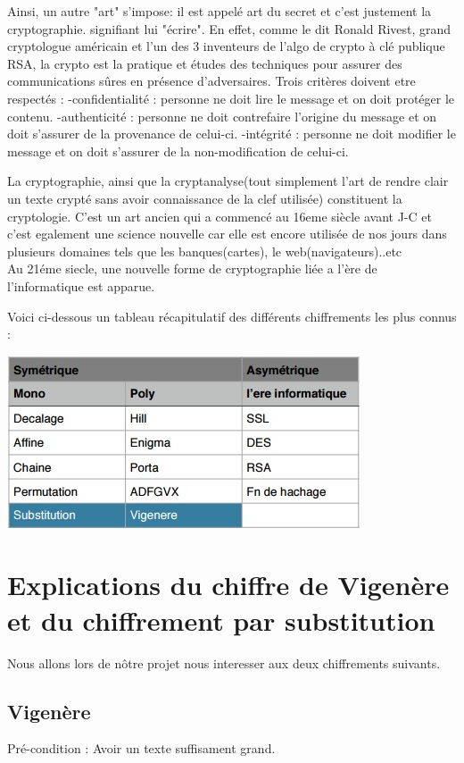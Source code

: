 \documentclass[a4]{article}
\begin{document}
				Ainsi, un autre "art" s'impose: il est appelé art du secret et c'est justement la cryptographie.
				signifiant lui "écrire". En effet, comme le dit Ronald Rivest, grand cryptologue américain et l'un des 3 inventeurs de l'algo
				de crypto à clé publique RSA, la crypto est la pratique et études des techniques pour assurer des communications sûres en présence d'adversaires.
				Trois critères doivent etre respectés : 
				-confidentialité : personne ne doit lire le message et on doit protéger le contenu.
				-authenticité : personne ne doit contrefaire l'origine du message et on doit s'assurer de la 							provenance de celui-ci.
				-intégrité : personne ne doit modifier le message et on doit s'assurer de la non-modification 							de celui-ci.

				La cryptographie, ainsi que la cryptanalyse(tout simplement l'art de rendre clair un texte crypté sans avoir connaissance de la clef utilisée) constituent la cryptologie.
				C'est un art ancien qui a commencé au 16eme siècle avant J-C et c'est egalement une science nouvelle car elle est encore utilisée de nos jours dans plusieurs domaines tels que les banques(cartes), le web(navigateurs)..etc\\
				Au 21éme siecle, une nouvelle forme de cryptographie liée a l'ère de l'informatique est apparue.
				
				Voici ci-dessous un tableau récapitulatif des différents chiffrements les plus connus :
				\\
				\begin{center}\includegraphics[scale=0.6]{Tab1.jpg}\end{center}
				
	\section{Explications du chiffre de Vigenère et du chiffrement par substitution}
	 Nous allons lors de nôtre projet nous interesser aux deux chiffrements suivants.
		\subsection{Vigenère}
			Pré-condition : Avoir un texte suffisament grand.\\			    
\end{document}
